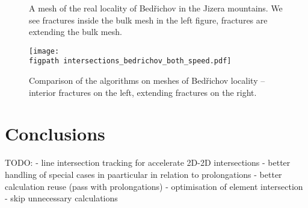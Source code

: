 \documentclass{elsarticle}
\newcommand{\figpath}{figures/}
\begin{document}
\begin{figure}[!htb]
    \hspace{3pt}
    \caption{A mesh of the real locality of Bed{\v r}ichov in the Jizera mountains.
             We see fractures inside the bulk mesh in the left figure,
             fractures are extending the bulk mesh.}
    \label{fig:bedrichov_meshes}
\end{figure}

\begin{figure}[!htb]
    \centering
    \texttt{[image: \\figpath intersections\_bedrichov\_both\_speed.pdf]}
    \caption{Comparison of the algorithms on meshes of Bed{\v r}ichov locality -- interior fractures on the left,
             extending fractures on the right.}
    \label{fig:bedrichov_speed}
\end{figure}





\section{Conclusions}
\label{sec:conclusins}

TODO:
- line intersection tracking for accelerate 2D-2D intersections
- better handling of special cases in paarticular in relation to prolongations
- better calculation reuse (pass with prolongations)
- optimisation of element intersection - skip unnecessary calculations






% 
% 
% 
  
 
\end{document}
